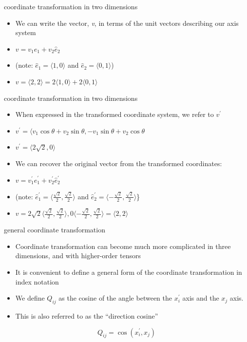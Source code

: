 \documentclass[
  letterpaper,
  ignorenonframetext,
  aspectratio=43,
  handout,
  12pt]{beamer}
\providecommand{\tightlist}{%
  \setlength{\itemsep}{0pt}\setlength{\parskip}{0pt}}
\providecommand{\tightlist}{%
\setlength{\itemsep}{0pt}\setlength{\parskip}{0pt}}
\begin{document}
\begin{frame}{coordinate transformation in two dimensions}
\protect\hypertarget{coordinate-transformation-in-two-dimensions-4}{}
\begin{itemize}
\tightlist
\item
  We can write the vector, \emph{v}, in terms of the unit vectors
  describing our axis system
\item
  \(v = v_1 \hat{e}_1 + v_2 \hat{e}_2\)
\item
  (note: \(\hat{e}_1=\langle 1, 0 \rangle\) and
  \(\hat{e}_2 = \langle 0,1 \rangle\))
\item
  \(v = \langle 2, 2 \rangle = 2\langle 1, 0 \rangle + 2\langle 0, 1 \rangle\)
\end{itemize}
\end{frame}

\begin{frame}{coordinate transformation in two dimensions}
\protect\hypertarget{coordinate-transformation-in-two-dimensions-5}{}
\begin{itemize}
\tightlist
\item
  When expressed in the transformed coordinate system, we refer to
  \(v^\prime\)
\item
  \(v^\prime = \langle v_1 \cos \theta + v_2 \sin \theta, -v_1 \sin \theta + v_2 \cos \theta\)
\item
  \(v^\prime = \langle 2\sqrt{2}, 0 \rangle\)
\item
  We can recover the original vector from the transformed coordinates:
\item
  \(v = v_1^\prime \hat{e}_1^\prime + v_2^\prime \hat{e}_2^\prime\)
\item
  (note:
  \(\hat{e}_1^\prime=\langle \frac{\sqrt{2}}{2},\frac{\sqrt{2}}{2} \rangle\)
  and
  \(\hat{e}_2^\prime = \langle -\frac{\sqrt{2}}{2},\frac{\sqrt{2}}{2} \rangle\)\}
\item
  \(v = 2\sqrt{2}\langle \frac{\sqrt{2}}{2},\frac{\sqrt{2}}{2} \rangle, 0 \langle -\frac{\sqrt{2}}{2},\frac{\sqrt{2}}{2} \rangle = \langle 2, 2 \rangle\)
\end{itemize}
\end{frame}

\begin{frame}{general coordinate transformation}
\protect\hypertarget{general-coordinate-transformation}{}
\begin{itemize}
\tightlist
\item
  Coordinate transformation can become much more complicated in three
  dimensions, and with higher-order tensors
\item
  It is convenient to define a general form of the coordinate
  transformation in index notation
\item
  We define \(Q_{ij}\) as the cosine of the angle between the
  \(x_i^\prime\) axis and the \(x_j\) axis.
\item
  This is also referred to as the ``direction cosine''
\end{itemize}

\[Q_{ij} = \cos(x_i^\prime, x_j)\]
\end{frame}
\end{document}
